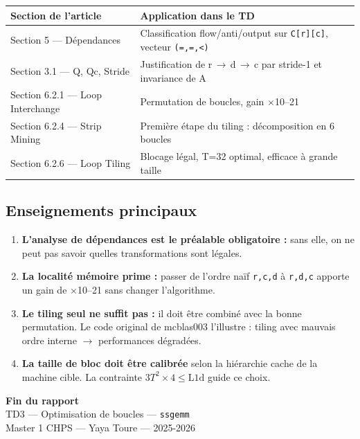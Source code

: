 \documentclass[a4paper,11pt]{article}
\newcommand{\code}[1]{\texttt{\color{CodeRed}#1}}
\begin{document}
\begin{center}
\begin{tabular}{L{4cm}L{9cm}}
  \toprule
  \textbf{Section de l'article} & \textbf{Application dans le TD} \\
  \midrule
  Section 5 --- D\'ependances         & Classification flow/anti/output sur \code{C[r][c]}, vecteur \texttt{(=,=,<)} \\
  Section 3.1 --- Q, Qc, Stride       & Justification de r\,$\to$\,d\,$\to$\,c par stride-1 et invariance de A \\
  Section 6.2.1 --- Loop Interchange  & Permutation de boucles, gain $\times$10--21 \\
  Section 6.2.4 --- Strip Mining      & Premi\`ere \'etape du tiling : d\'ecomposition en 6 boucles \\
  Section 6.2.6 --- Loop Tiling       & Blocage l\'egal, T=32 optimal, efficace \`a grande taille \\
  \bottomrule
\end{tabular}
\end{center}

\subsection{Enseignements principaux}

\begin{enumerate}[leftmargin=1.5em]
  \item \textbf{L'analyse de d\'ependances est le pr\'ealable obligatoire :} sans elle,
        on ne peut pas savoir quelles transformations sont l\'egales.
  \item \textbf{La localit\'e m\'emoire prime :} passer de l'ordre na\"if \code{r,c,d}
        \`a \code{r,d,c} apporte un gain de $\times$10--21 sans changer l'algorithme.
  \item \textbf{Le tiling seul ne suffit pas :} il doit \^etre combin\'e avec la bonne
        permutation. Le code original de mcblas003 l'illustre : tiling avec mauvais ordre
        interne $\to$ performances d\'egrad\'ees.
  \item \textbf{La taille de bloc doit \^etre calibr\'ee} selon la hi\'erarchie cache de
        la machine cible. La contrainte $3T^2 \times 4 \leq \text{L1d}$ guide ce choix.
\end{enumerate}

\vspace{1cm}
\begin{center}
\begin{tcolorbox}[
  width=0.85\linewidth,
  colback=BlueDark, colframe=BlueDark,
  arc=4pt, boxrule=1pt,
  left=16pt, right=16pt, top=12pt, bottom=12pt,
]
  \begin{center}
    {\large\bfseries\color{white} Fin du rapport}\\[4pt]
    {\small\color{BlueLight} TD3 --- Optimisation de boucles --- \texttt{ssgemm}}\\[2pt]
    {\small\color{BlueLight} Master 1 CHPS --- Yaya Toure --- 2025-2026}
  \end{center}
\end{tcolorbox}
\end{center}
\end{document}
